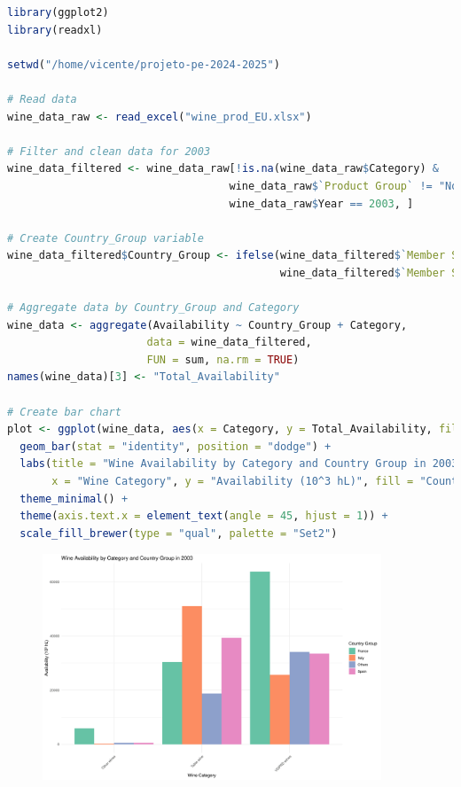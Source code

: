 \documentclass[11pt,a4paper]{article}
\begin{document}
\begin{lstlisting}[language=R]
library(ggplot2)
library(readxl)

setwd("/home/vicente/projeto-pe-2024-2025")

# Read data
wine_data_raw <- read_excel("wine_prod_EU.xlsx")

# Filter and clean data for 2003
wine_data_filtered <- wine_data_raw[!is.na(wine_data_raw$Category) & 
                                   wine_data_raw$`Product Group` != "Non-Vinified" & 
                                   wine_data_raw$Year == 2003, ]

# Create Country_Group variable
wine_data_filtered$Country_Group <- ifelse(wine_data_filtered$`Member State` %in% c("France", "Italy", "Spain"), 
                                           wine_data_filtered$`Member State`, "Others")

# Aggregate data by Country_Group and Category
wine_data <- aggregate(Availability ~ Country_Group + Category, 
                      data = wine_data_filtered, 
                      FUN = sum, na.rm = TRUE)
names(wine_data)[3] <- "Total_Availability"

# Create bar chart
plot <- ggplot(wine_data, aes(x = Category, y = Total_Availability, fill = Country_Group)) +
  geom_bar(stat = "identity", position = "dodge") +
  labs(title = "Wine Availability by Category and Country Group in 2003",
       x = "Wine Category", y = "Availability (10^3 hL)", fill = "Country Group") +
  theme_minimal() +
  theme(axis.text.x = element_text(angle = 45, hjust = 1)) +
  scale_fill_brewer(type = "qual", palette = "Set2")
\end{lstlisting}

\begin{figure}[htbp]
    \centering
    \includegraphics[width=0.9\textwidth]{wine_availability_2003.png}
\end{figure}
\end{document}
